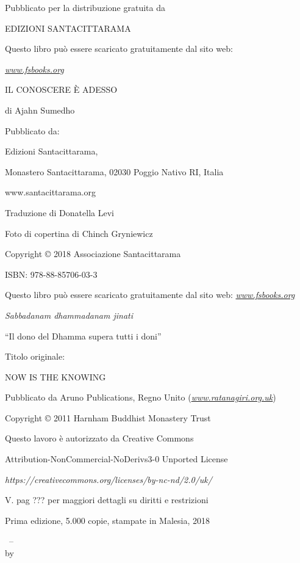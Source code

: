 \cleartoverso
\thispagestyle{empty}

{\copyrightsize
\centering
\setlength{\parindent}{0pt}%
\setlength{\parskip}{0.8\baselineskip}%


Pubblicato per la distribuzione gratuita da

EDIZIONI SANTACITTARAMA

Questo libro può essere scaricato gratuitamente dal sito web:

\href{http://www.forestsangha.org/}{\emph{www.fsbooks.org}}

IL CONOSCERE È ADESSO

di Ajahn Sumedho

Pubblicato da:

Edizioni Santacittarama,

Monastero Santacittarama, 02030 Poggio Nativo RI, Italia

www.santacittarama.org

Traduzione di Donatella Levi

Foto di copertina di Chinch Gryniewicz

Copyright © 2018 Associazione Santacittarama

ISBN: 978-88-85706-03-3

Questo libro può essere scaricato gratuitamente dal sito web:
\href{http://www.forestsangha.org/}{\emph{\emph{www.fsbooks.org}}}

\emph{Sabbadanam dhammadanam jinati}

``Il dono del Dhamma supera tutti i doni''

Titolo originale:

NOW IS THE KNOWING

Pubblicato da Aruno Publications, Regno Unito
(\href{http://www.ratanagiri.org.uk/}{\emph{www.ratanagiri.org.uk}})

Copyright © 2011 Harnham Buddhist Monastery Trust

Questo lavoro è autorizzato da Creative Commons

Attribution-NonCommercial-NoDerivs3-0 Unported License

\emph{https://creativecommons.org/licenses/by-nc-nd/2.0/uk/}

V. pag ??? per maggiori dettagli su diritti e restrizioni

Prima edizione, 5.000 copie, stampate in Malesia, 2018


\thetitle\ -- \thesubtitle\\
by \theauthor

}
